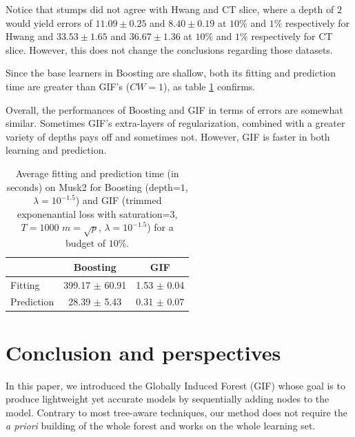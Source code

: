 \documentclass{article}
\begin{document}
Notice that stumps did not agree with Hwang and CT slice, where a depth of $2$ 
would yield errors of $11.09 \pm 0.25$ and $8.40 \pm 0.19$ at $10\%$ and 
$1\%$ respectively for Hwang and $33.53 \pm 1.65$ and $36.67 \pm 1.36$ at 
$10\%$ and $1\%$ respectively for CT slice. However, this does not change the 
conclusions regarding those datasets.

Since the base learners in Boosting are shallow, both its fitting and 
prediction time are greater than GIF's ($CW=1$), as table 
\ref{tab:boostingTime} confirms.

Overall, the performances of Boosting and GIF in terms of errors are somewhat 
similar. Sometimes GIF's extra-layers of regularization, combined with a 
greater variety of depths pays off and sometimes not. However, GIF is faster in 
both learning and prediction.


\begin{table}[t]
\caption{Average fitting and prediction time (in seconds) on Musk2 for 
Boosting (depth=$1$, $\lambda=10^{-1.5}$) and GIF (trimmed exponenantial loss 
with saturation=3, $T=1000$ $m=\sqrt{p}$, $\lambda=10^{-1.5}$) for a budget of 
$10\%$.}
\label{tab:boostingTime}
\vskip 0.15in
\begin{center}
\begin{small}
\begin{tabular}{l|c|c}
\hline
& Boosting & GIF \\
\hline
Fitting & 399.17 $\pm$ 60.91 & 1.53 $\pm$ 0.04 \\
Prediction & 28.39 $\pm$ 5.43 & 0.31 $\pm$ 0.07 \\
\hline
\end{tabular}
\end{small}
\end{center}
\vskip -0.1in
\end{table}








\section{Conclusion and perspectives}
\label{sec:conclusion}

In this paper, we introduced the Globally Induced Forest (GIF) whose goal is to 
produce lightweight yet accurate models by sequentially adding nodes to the 
model. Contrary to most tree-aware techniques, our method does not require the 
{\it a priori} building of the whole forest and works on the whole learning set.
\end{document}
